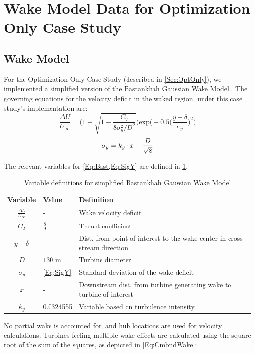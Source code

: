\documentclass[12pt]{article}
\begin{document}
\newpage
\section{Wake Model Data for Optimization Only Case Study}\label{app:WakeModel}
\subsection{Wake Model}
    For the Optimization Only Case Study (described in \cref{Sec:OptOnly}), we implemented a simplified version of the Bastankhah Gaussian Wake Model \cite{Thomas2018}. The governing equations for the velocity deficit in the waked region, under this case study's implementation are:
    \begin{equation}
        \frac{\Delta U}{U_{\infty}}
        =
        \Bigg(
            1 - \sqrt{
                1 - \frac{C_T}
                    {8\sigma_{y}^{2}/D^2}
                }
        \Bigg)
                \text{exp}\bigg(
                    -0.5\Big(
                        \frac{y-\delta}{\sigma_{y}}
                    \Big)^2
                \bigg)
        \label{Eq:Bast}
    \end{equation}
    \begin{equation}
        \sigma_y = k_y\cdot x + \frac{D}{\sqrt{8}} \\
        \label{Eq:SigY}
    \end{equation}
    
    The relevant variables for \cref{Eq:Bast,Eq:SigY} are defined in \cref{tab:WakeModel}.
    
    \begin{table}[H]
        \centering
        \begin{tabular}{|c|l|l|}
            \hline
             Variable & Value & Definition \\ \hline
            $\frac{\Delta U}{U_{\infty}}$ & - & Wake velocity deficit \\ \hline
            $C_T$ & $\frac{8}{9}$ & Thrust coefficient \\ \hline
            $y-\delta$ & - & Dist. from point of interest to the wake center in cross-stream direction \\ \hline
            $D$ & $130$ m & Turbine diameter \\ \hline
            $\sigma_y$ & \cref{Eq:SigY} & Standard deviation of the wake deficit \\ \hline
            $x$ & - & Downstream dist. from turbine generating wake to turbine of interest \\ \hline
            $k_y$ & 0.0324555 & Variable based on turbulence intensity \cite{Niayifar2016, Thomas2018} \\ \hline
        \end{tabular}
        \caption{Variable definitions for simplified Bastankhah Gaussian Wake Model}
        \label{tab:WakeModel}
    \end{table}
\vspace{-0.25cm}
    No partial wake is accounted for, and hub locations are used for velocity calculations. Turbines feeling multiple wake effects are calculated using the square root of the sum of the squares, as depicted in \cref{Eq:CmbndWake}:
    
\end{document}
